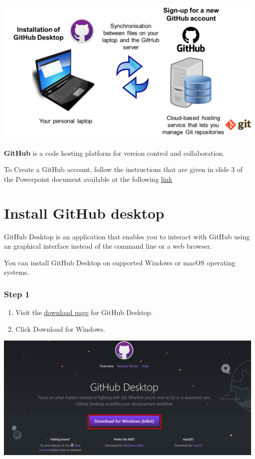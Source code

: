 \documentclass[
  letterpaper,
  DIV=11,
  numbers=noendperiod]{scrreprt}
\providecommand{\tightlist}{%
  \setlength{\itemsep}{0pt}\setlength{\parskip}{0pt}}\usepackage{longtable,booktabs,array}
\begin{document}
\includegraphics{./images/paste-081F7F03.png}

\textbf{GitHub} is a code hosting platform for version control and
collaboration.

To Create a GitHub account, follow the instructions that are given in
slide 3 of the Powerpoint document available at the following
\href{https://drive.switch.ch/index.php/s/1eFnksrX0UtjfZV}{link}

\hypertarget{sec-GitHub-Desktop-installation}{%
\section{Install GitHub desktop}\label{sec-GitHub-Desktop-installation}}

GitHub Desktop is an application that enables you to interact with
GitHub using an graphical interface instead of the command line or a web
browser.

You can install GitHub Desktop on supported Windows or macOS operating
systems.

\hypertarget{step-1-4}{%
\subsubsection{Step 1}\label{step-1-4}}

\begin{enumerate}
\def\labelenumi{\arabic{enumi}.}
\tightlist
\item
  Visit the \href{https://desktop.github.com/}{download page} for GitHub
  Desktop.
\item
  Click Download for Windows.
\end{enumerate}

\includegraphics{./images/paste-465BAC3C.png}
\end{document}
